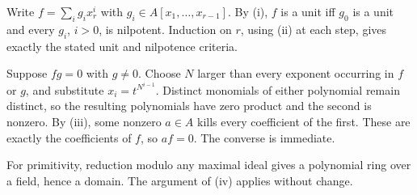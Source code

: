 Write $f=\sum_i g_ix_r^i$ with $g_i\in A[x_1,\ldots,x_{r-1}]$. By (i), $f$ is a unit iff $g_0$ is a unit and every $g_i$, $i>0$, is nilpotent. Induction on $r$, using (ii) at each step, gives exactly the stated unit and nilpotence criteria.

Suppose $fg=0$ with $g\ne0$. Choose $N$ larger than every exponent occurring in $f$ or $g$, and substitute $x_i=t^{N^{i-1}}$. Distinct monomials of either polynomial remain distinct, so the resulting polynomials have zero product and the second is nonzero. By (iii), some nonzero $a\in A$ kills every coefficient of the first. These are exactly the coefficients of $f$, so $af=0$. The converse is immediate.

For primitivity, reduction modulo any maximal ideal gives a polynomial ring over a field, hence a domain. The argument of (iv) applies without change.
